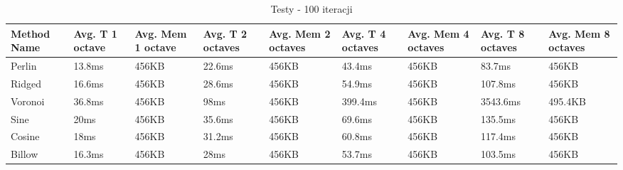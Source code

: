 \begin{table}[h]
\centering
\begin{tabularx}{1\textwidth}{ |>{\centering\arraybackslash}X||>{\centering\arraybackslash}X|>{\centering\arraybackslash}X|>{\centering\arraybackslash}X|>{\centering\arraybackslash}X|>{\centering\arraybackslash}X|>{\centering\arraybackslash}X|>{\centering\arraybackslash}X|}
\hline
Method Name & Avg. T 1 octave & Avg. Mem 1 octave & Avg. T 2 octaves & Avg. Mem 2 octaves & Avg. T 4 octaves & Avg. Mem 4 octaves & Avg. T 8 octaves & Avg. Mem 8 octaves\\
\hline
\hline
Perlin & 13.8ms & 456KB & 22.6ms & 456KB & 43.4ms & 456KB & 83.7ms & 456KB\\
\hline
Ridged & 16.6ms & 456KB & 28.6ms & 456KB & 54.9ms & 456KB & 107.8ms & 456KB\\
\hline
Voronoi & 36.8ms & 456KB & 98ms & 456KB & 399.4ms & 456KB & 3543.6ms & 495.4KB\\
\hline
Sine & 20ms & 456KB & 35.6ms & 456KB & 69.6ms & 456KB & 135.5ms & 456KB\\
\hline
Cosine & 18ms & 456KB & 31.2ms & 456KB & 60.8ms & 456KB & 117.4ms & 456KB\\
\hline
Billow & 16.3ms & 456KB & 28ms & 456KB & 53.7ms & 456KB & 103.5ms & 456KB\\
\hline
\end{tabularx}
\caption{Testy - 100 iteracji}
\label{ table:tests_table}
\end{table}
